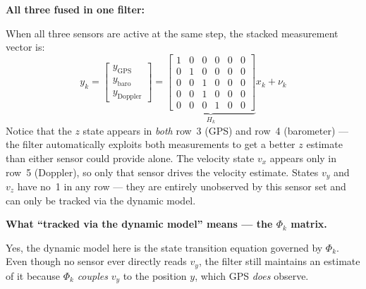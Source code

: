 \documentclass[12pt, a4paper]{article}
\begin{document}
\begin{notebox}
  \bigskip
  \textbf{All three fused in one filter:}

  When all three sensors are active at the same step, the stacked
  measurement vector is:
  \[
    y_k =
    \begin{bmatrix} y_\text{GPS} \\ y_\text{baro} \\ y_\text{Doppler} \end{bmatrix}
    =
    \underbrace{\begin{bmatrix}
      1 & 0 & 0 & 0 & 0 & 0 \\
      0 & 1 & 0 & 0 & 0 & 0 \\
      0 & 0 & 1 & 0 & 0 & 0 \\
      0 & 0 & 1 & 0 & 0 & 0 \\
      0 & 0 & 0 & 1 & 0 & 0
    \end{bmatrix}}_{H_k}
    x_k + \nu_k
  \]
  Notice that the $z$ state appears in \emph{both} row~3 (GPS) and row~4
  (barometer) --- the filter automatically exploits both measurements to get
  a better $z$ estimate than either sensor could provide alone.
  The velocity state $v_x$ appears only in row~5 (Doppler), so only that
  sensor drives the velocity estimate.
  States $v_y$ and $v_z$ have no~1 in any row --- they are entirely
  unobserved by this sensor set and can only be tracked via the dynamic model.

  \textbf{What ``tracked via the dynamic model'' means --- the $\Phi_k$ matrix.}

  Yes, the dynamic model here is the state transition equation governed by
  $\Phi_k$.
  Even though no sensor ever directly reads $v_y$, the filter still maintains
  an estimate of it because $\Phi_k$ \emph{couples} $v_y$ to the position $y$,
  which GPS \emph{does} observe.


\end{notebox}
\end{document}
